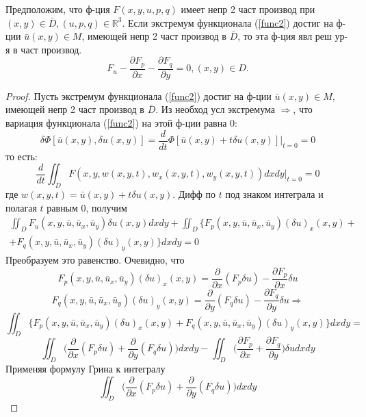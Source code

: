 \begin{theorem}
    Предположим, что ф-ция $F(x, y, u, p, q)$ имеет
    непр 2 част производ при $(x, y) \in \bar D, (u, p, q) \in \mathbb{R}^3$.
    Если экстремум функционала (\ref{func2}) достиг на ф-ции $\bar u(x, y) \in M$, имеющей непр 2 част производ в $\bar D$, то эта ф-ция явл реш ур-я в част производ.
    \begin{equation}
        F_u-\frac{\partial F_p}{\partial x}-\frac{\partial F_q}{\partial y}=0, (x,y)\in D.
        \label{resh1}
    \end{equation}
    
\end{theorem}
\begin{proof}
    Пусть экстремум функционала (\ref{func2}) достиг на ф-ции $\bar u(x, y) \in M$, имеющей непр 2 част производ в $\bar D$. Из необход усл экстремума $\Longrightarrow$, что вариация
    функционала (\ref{func2}) на этой ф-ции равна 0:
    $$\delta \Phi[\bar u(x,y), \delta u(x,y)]=\frac{d}{dt}\Phi[\bar u(x,y)+t\delta u(x,y)]\Big|_{t=0}=0$$ то есть:
    $$\frac{d}{dt} \iint_D F(x, y, w(x, y, t), w_x(x, y, t), w_y(x, y, t))dxdy\Big|_{t=0}=0$$   
    где $w(x, y, t) = \bar u(x, y) + t\delta u(x, y)$. Дифф по $t$ под знаком интеграла и полагая $t$ равным 0, получим
    \begin{equation}
    \begin{gathered}
        \iint_D F_u(x, y, \bar u, \bar u_x, \bar u_y)\delta u(x, y)dxdy+\iint_D \Big\{F_p(x, y, \bar u, \bar u_x, \bar u_y)(\delta u)_x(x, y)+\\
        +F_q(x, y,\bar u,\bar u_x, \bar u_y)(\delta u)_y(x, y)\Big\}dxdy=0        
    \end{gathered}
        \label{dd}
    \end{equation}
    Преобразуем это равенство. Очевидно, что
    $$F_p(x, y, \bar u, \bar u_x, \bar u_y)(\delta u)_x(x, y)=\frac{\partial}{\partial x}
    (F_p\delta u) - \frac{\partial F_p}{\partial x}\delta u$$
    $$F_q(x, y, \bar u, \bar u_x, \bar u_y)(\delta u)_y(x, y)=\frac{\partial}{\partial y}
    (F_q\delta u) - \frac{\partial F_q}{\partial y}\delta u \Longrightarrow$$
    $$\iint_D \Big\{ F_p(x,y,\bar u, \bar u_x, \bar u_y)(\delta u)_x(x, y)+F_q(x,y,\bar u, \bar u_x, \bar u_y)(\delta u)_y(x, y)\Big\}dxdy=$$
    $$\iint_D \Big( \frac{\partial}{\partial x}(F_p\delta u) + \frac{\partial}{\partial y}(F_q\delta u)\Big)dxdy-\iint_D \Big( \frac{\partial F_p}{\partial x}+\frac{\partial F_q}{\partial y}\Big)\delta u dxdy$$
    Применяя формулу Грина к интегралу
    $$\iint_D \Big( \frac{\partial}{\partial x}(F_p\delta u) + \frac{\partial}{\partial y}(F_q\delta u)\Big)dxdy$$

\end{proof}
